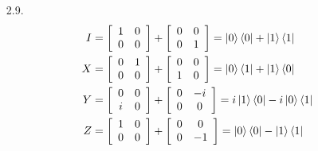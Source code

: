 \documentclass[a4paper,12pt]{article}
\begin{document}
\begin{enumerate}
	\item[2.9.]
	\begin{align*}
		I
		&= \left[ \begin{array}{cc}
		1 & 0 \\
		0 & 0
		\end{array} \right]
		+ \left[ \begin{array}{cc}
		0 & 0 \\
		0 & 1
		\end{array} \right]
		= \ket{0}\bra{0} + \ket{1}\bra{1}
		\\
		X
		&= \left[ \begin{array}{cc}
		0 & 1 \\
		0 & 0
		\end{array} \right]
		+ \left[ \begin{array}{cc}
		0 & 0 \\
		1 & 0
		\end{array} \right]
		= \ket{0}\bra{1} + \ket{1}\bra{0}
		\\
		Y
		&= \left[ \begin{array}{cc}
		0 & 0 \\
		i & 0
		\end{array} \right]
		+ \left[ \begin{array}{cc}
		0 & -i \\
		0 & 0
		\end{array} \right]
		= i\ket{1}\bra{0} - i\ket{0}\bra{1}
		\\
		Z
		&= \left[ \begin{array}{cc}
		1 & 0 \\
		0 & 0
		\end{array} \right]
		+ \left[ \begin{array}{cc}
		0 & 0 \\
		0 & -1
		\end{array} \right]
		= \ket{0}\bra{0} - \ket{1}\bra{1}
	\end{align*}
	

\end{enumerate}
\end{document}
